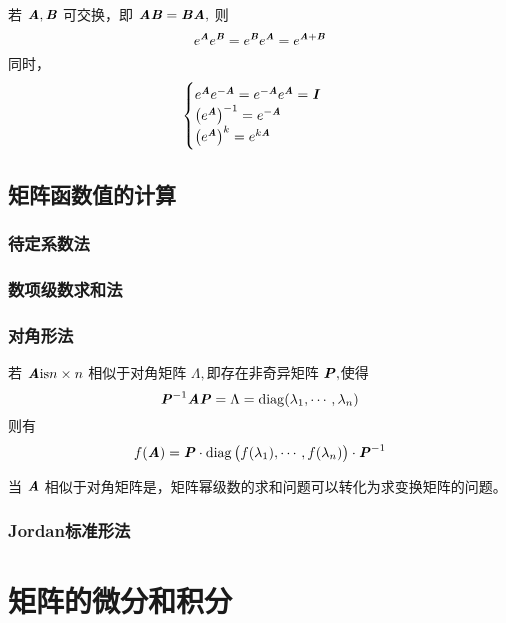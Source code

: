 \begin{theorem}
    若 $\MA, \MB$ 可交换，即 $\MA \MB = \MB \MA,$ 则
    \[
        e^{\MA} e^{\MB} = e^{\MB} e^{\MA} = e^{\MA + \MB}
    \]
    同时，
    \[
        \begin{cases}
            e^{\MA} e^{-\MA} = e^{-\MA} e^{\MA} = \MI \\
            \left( e^{\MA} \right)^{-1} = e^{-\MA} \\
            \left( e^{\MA} \right)^{k} = e^{k\MA}
        \end{cases}
    \]
\end{theorem}

\subsection{矩阵函数值的计算}
\label{sub:矩阵函数值的计算}

\subsubsection{待定系数法}
\label{ssub:待定系数法}

\subsubsection{数项级数求和法}
\label{ssub:数项级数求和法}

\subsubsection{对角形法}
\label{ssub:对角形法}

若 $\ann$ 相似于对角矩阵 $\Lambda,$即存在非奇异矩阵 $\MP,$使得
\[
    \MP^{-1} \MA \MP = \Lambda = \mathrm{diag}(\lambda_1, \cdots, \lambda_n)
\]
则有
\[
    f(\MA) = \MP \cdot \mathrm{diag}\left(f(\lambda_1), \cdots, f(\lambda_n)\right) \cdot \MP^{-1}
\]

当 $\MA$ 相似于对角矩阵是，矩阵幂级数的求和问题可以转化为求变换矩阵的问题。
\subsubsection{Jordan标准形法}
\label{ssub:Jordan标准形法}

\begin{definition}
\end{definition}

\section{矩阵的微分和积分}
\label{sec:矩阵的微分和积分}

